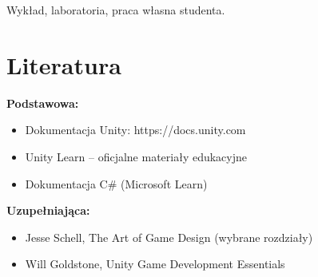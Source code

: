 \documentclass[12pt, a4paper]{article}
\begin{document}
Wykład, laboratoria, praca własna studenta.

\section{Literatura}

\textbf{Podstawowa:}
\begin{itemize}
  \item Dokumentacja Unity: https://docs.unity.com
  \item Unity Learn – oficjalne materiały edukacyjne
  \item Dokumentacja C\# (Microsoft Learn)
\end{itemize}

\textbf{Uzupełniająca:}
\begin{itemize}
  \item Jesse Schell, The Art of Game Design (wybrane rozdziały)
  \item Will Goldstone, Unity Game Development Essentials
\end{itemize}
\end{document}
